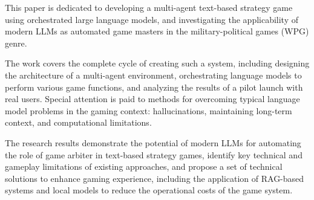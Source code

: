 This paper is dedicated to developing a multi-agent text-based strategy game using orchestrated large language models, and investigating the applicability of modern LLMs as automated game masters in the military-political games (WPG) genre.

The work covers the complete cycle of creating such a system, including designing the architecture of a multi-agent environment, orchestrating language models to perform various game functions, and analyzing the results of a pilot launch with real users. Special attention is paid to methods for overcoming typical language model problems in the gaming context: hallucinations, maintaining long-term context, and computational limitations.

The research results demonstrate the potential of modern LLMs for automating the role of game arbiter in text-based strategy games, identify key technical and gameplay limitations of existing approaches, and propose a set of technical solutions to enhance gaming experience, including the application of RAG-based systems and local models to reduce the operational costs of the game system.

